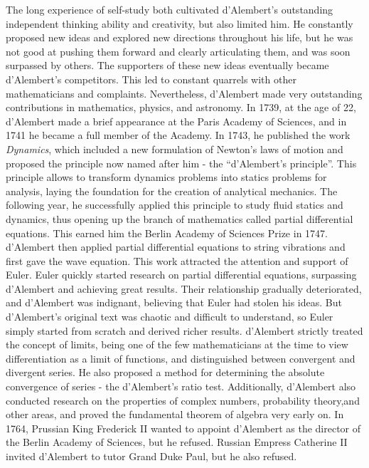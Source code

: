 \documentclass[b5paper]{article}
\begin{document}
\begin{mdframed}
The long experience of self-study both cultivated d'Alembert's outstanding independent thinking ability and creativity, but also limited him. He constantly proposed new ideas and explored new directions throughout his life, but he was not good at pushing them forward and clearly articulating them, and was soon surpassed by others. The supporters of these new ideas eventually became d'Alembert's competitors. This led to constant quarrels with other mathematicians and complaints. Nevertheless, d'Alembert made very outstanding contributions in mathematics, physics, and astronomy. In 1739, at the age of 22, d'Alembert made a brief appearance at the Paris Academy of Sciences, and in 1741 he became a full member of the Academy. In 1743, he published the work \emph{Dynamics}, which included a new formulation of Newton's laws of motion and proposed the principle now named after him - the \enquote{d'Alembert's principle}. This principle allows to transform dynamics problems into statics problems for analysis, laying the foundation for the creation of analytical mechanics. The following year, he successfully applied this principle to study fluid statics and dynamics, thus opening up the branch of mathematics called partial differential equations. This earned him the Berlin Academy of Sciences Prize in 1747. d'Alembert then applied partial differential equations to string vibrations and first gave the wave equation. This work attracted the attention and support of Euler. Euler quickly started research on partial differential equations, surpassing d'Alembert and achieving great results. Their relationship gradually deteriorated, and d'Alembert was indignant, believing that Euler had stolen his ideas. But d'Alembert's original text was chaotic and difficult to understand, so Euler simply started from scratch and derived richer results. d'Alembert strictly treated the concept of limits, being one of the few mathematicians at the time to view differentiation as a limit of functions, and distinguished between convergent and divergent series. He also proposed a method for determining the absolute convergence of series - the d'Alembert's ratio test. Additionally, d'Alembert also conducted research on the properties of complex numbers, probability theory,and other areas, and proved the fundamental theorem of algebra very early on. In 1764, Prussian King Frederick II wanted to appoint d'Alembert as the director of the Berlin Academy of Sciences, but he refused. Russian Empress Catherine II invited d'Alembert to tutor Grand Duke Paul, but he also refused.


\end{mdframed}
\end{document}
